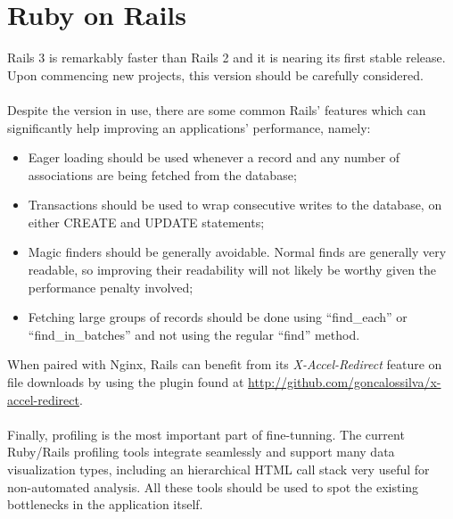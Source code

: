 \section{Ruby on Rails}
Rails 3 is remarkably faster than Rails 2 and it is nearing its first stable release. Upon commencing new projects, this version should be carefully considered.\\\\
Despite the version in use, there are some common Rails' features which can significantly help improving an applications' performance, namely:
\begin{itemize}
  \item Eager loading should be used whenever a record and any number of associations are being fetched from the database;
  \item Transactions should be used to wrap consecutive writes to the database, on either CREATE and UPDATE statements;
  \item Magic finders should be generally avoidable. Normal finds are generally very readable, so improving their readability will not likely be worthy given the performance penalty involved;
  \item Fetching large groups of records should be done using ``find\_each'' or ``find\_in\_batches'' and not using the regular ``find'' method.
\end{itemize}
When paired with Nginx, Rails can benefit from its \textit{X-Accel-Redirect} feature on file downloads by using the plugin found at \url{http://github.com/goncalossilva/x-accel-redirect}.\\\\
Finally, profiling is the most important part of fine-tunning. The current Ruby/Rails profiling tools integrate seamlessly and support many data visualization types, including an hierarchical HTML call stack very useful for non-automated analysis. All these tools should be used to spot the existing bottlenecks in the application itself.
